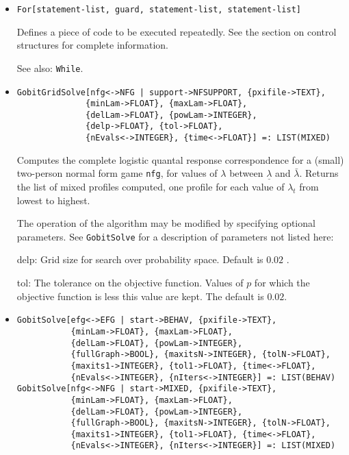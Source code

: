 \begin{itemize}
\item
\protect \large \begin{verbatim}
For[statement-list, guard, statement-list, statement-list]
\end{verbatim}\normalsize

\bd
Defines a piece of code to be executed repeatedly.  See the section
on control structures for complete information.
\item
[See also:] \verb+While+.
\ed


\item
\protect \large \begin{verbatim}
GobitGridSolve[nfg<->NFG | support->NFSUPPORT, {pxifile->TEXT},
              {minLam->FLOAT}, {maxLam->FLOAT}, 
              {delLam->FLOAT}, {powLam->INTEGER}, 
              {delp->FLOAT}, {tol->FLOAT},
              {nEvals<->INTEGER}, {time<->FLOAT}] =: LIST(MIXED)
\end{verbatim}\normalsize

\bd
Computes the complete logistic quantal response correspondence for
a (small) two-person normal form game \verb+nfg+, for values of
$\lambda$ between $\underline{\lambda}$ and $\bar{\lambda}.$ Returns
the list of mixed profiles computed, one profile for each value of
$\lambda_t$ from lowest to highest.

The operation of the algorithm may be modified by specifying optional
parameters.  See {\tt GobitSolve} for a description of parameters
not listed here:
\bd
\item
[delp:] Grid size for search over probability space.  Default is $0.02$ .
\item
[tol:] The tolerance on the objective function.  Values of $p$ for
which the objective function is less this value are kept.  The default
is $0.02$.  
\ed
\ed

\item
\protect \large \begin{verbatim}
GobitSolve[efg<->EFG | start->BEHAV, {pxifile->TEXT},
           {minLam->FLOAT}, {maxLam->FLOAT},
           {delLam->FLOAT}, {powLam->INTEGER},
           {fullGraph->BOOL}, {maxitsN->INTEGER}, {tolN->FLOAT},
           {maxits1->INTEGER}, {tol1->FLOAT}, {time<->FLOAT},
           {nEvals<->INTEGER}, {nIters<->INTEGER}] =: LIST(BEHAV)
GobitSolve[nfg<->NFG | start->MIXED, {pxifile->TEXT},
           {minLam->FLOAT}, {maxLam->FLOAT},
           {delLam->FLOAT}, {powLam->INTEGER},
           {fullGraph->BOOL}, {maxitsN->INTEGER}, {tolN->FLOAT},
           {maxits1->INTEGER}, {tol1->FLOAT}, {time<->FLOAT},
           {nEvals<->INTEGER}, {nIters<->INTEGER}] =: LIST(MIXED)
\end{verbatim}\normalsize


\end{itemize}
